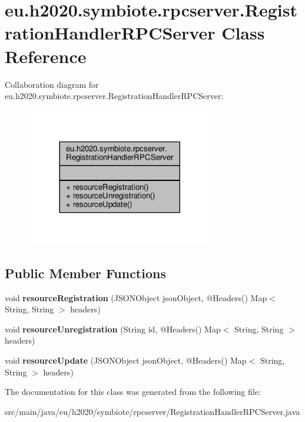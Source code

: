 \hypertarget{classeu_1_1h2020_1_1symbiote_1_1rpcserver_1_1RegistrationHandlerRPCServer}{}\section{eu.\+h2020.\+symbiote.\+rpcserver.\+Registration\+Handler\+R\+P\+C\+Server Class Reference}
\label{classeu_1_1h2020_1_1symbiote_1_1rpcserver_1_1RegistrationHandlerRPCServer}


Collaboration diagram for eu.\+h2020.\+symbiote.\+rpcserver.\+Registration\+Handler\+R\+P\+C\+Server\+:
\nopagebreak
\begin{figure}[H]
\begin{center}
\leavevmode
\includegraphics[width=233pt]{classeu_1_1h2020_1_1symbiote_1_1rpcserver_1_1RegistrationHandlerRPCServer__coll__graph}
\end{center}
\end{figure}
\subsection*{Public Member Functions}
\begin{DoxyCompactItemize}
\item 
\mbox{\label{classeu_1_1h2020_1_1symbiote_1_1rpcserver_1_1RegistrationHandlerRPCServer_a59d3a42c7b9a1b51b7956226abc1d66e}} 
void {\bfseries resource\+Registration} (J\+S\+O\+N\+Object json\+Object, @Headers() Map$<$ String, String $>$ headers)
\item 
\mbox{\label{classeu_1_1h2020_1_1symbiote_1_1rpcserver_1_1RegistrationHandlerRPCServer_acbb159563455460f6a3da99e5353d11a}} 
void {\bfseries resource\+Unregistration} (String id, @Headers() Map$<$ String, String $>$ headers)
\item 
\mbox{\label{classeu_1_1h2020_1_1symbiote_1_1rpcserver_1_1RegistrationHandlerRPCServer_add97d8f15845030d4f09f7db65107bec}} 
void {\bfseries resource\+Update} (J\+S\+O\+N\+Object json\+Object, @Headers() Map$<$ String, String $>$ headers)
\end{DoxyCompactItemize}


The documentation for this class was generated from the following file\+:\begin{DoxyCompactItemize}
\item 
src/main/java/eu/h2020/symbiote/rpcserver/Registration\+Handler\+R\+P\+C\+Server.\+java\end{DoxyCompactItemize}
